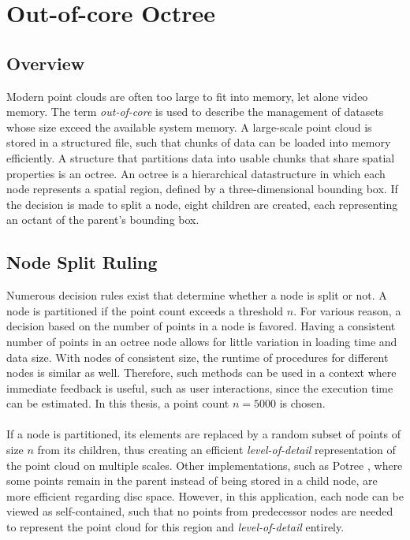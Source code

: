\chapter{Out-of-core Octree}
\label{chap:octree}


\section{Overview}

Modern point clouds are often too large to fit into memory, let alone video memory. The term \textit{out-of-core} is used to describe the management of datasets whose size exceed the available system memory. 
A large-scale point cloud is stored in a structured file, such that chunks of data can be loaded into memory efficiently. A structure that partitions data into usable chunks that share spatial properties is an octree. 
An octree is a hierarchical datastructure in which each node represents a spatial region, defined by a three-dimensional bounding box. If the decision is made to split a node, eight children are created, each representing an octant of the parent's bounding box.


\section{Node Split Ruling}

Numerous decision rules exist that determine whether a node is split or not. A node is partitioned if the point count exceeds a threshold $n$.  For various reason, a decision based on the number of points in a node is favored. 
Having a consistent number of points in an octree node allows for little variation in loading time and data size. With nodes of consistent size, the runtime of procedures for different nodes is similar as well. Therefore, such methods can be used in a context where immediate feedback is useful, such as user interactions, since the execution time can be estimated. In this thesis, a point count $n = 5000$ is chosen. 
\\
\\
If a node is partitioned, its elements are replaced by a random subset of points of size $n$ from its children, thus creating an efficient \textit{level-of-detail} representation of the point cloud on multiple scales. 
Other implementations, such as Potree \cite{SCHUETZ-2016-POT}, where some points remain in the parent instead of being stored in a child node, are more efficient regarding disc space. However, in this application, each node can be viewed as self-contained, such that no points from predecessor nodes are needed to represent the point cloud for this region and \textit{level-of-detail} entirely. 


